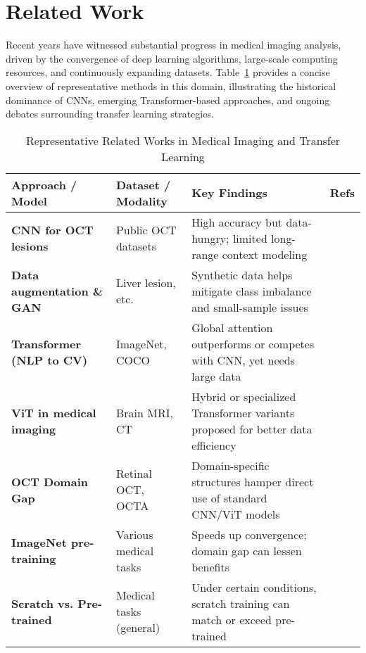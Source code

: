 \section{Related Work}
\label{sec:related}
	
	Recent years have witnessed substantial progress in medical imaging analysis, driven by the convergence of deep learning algorithms, large-scale computing resources, and continuously expanding datasets. Table~\ref{tab:relatedsummary} provides a concise overview of representative methods in this domain, illustrating the historical dominance of CNNs, emerging Transformer-based approaches, and ongoing debates surrounding transfer learning strategies.
	
	\begin{table}[ht]
		\centering
		\caption{Representative Related Works in Medical Imaging and Transfer Learning}
		\label{tab:relatedsummary}
		\begin{tabular}{p{3.2cm}p{3.6cm}p{5cm}p{1.2cm}}
			\toprule
			\textbf{Approach / Model} 
			& \textbf{Dataset / Modality} 
			& \textbf{Key Findings} 
			& \textbf{Refs} \\
			\midrule
			\textbf{CNN for OCT lesions}  
			& Public OCT datasets  
			& High accuracy but data-hungry; limited long-range context modeling  
			& \cite{30Esteva2017,16Kermany2018} \\
			
			\textbf{Data augmentation \& GAN}  
			& Liver lesion, etc.  
			& Synthetic data helps mitigate class imbalance and small-sample issues  
			& \cite{31Frid-Adar2018} \\
			
			\textbf{Transformer (NLP to CV)}
			& ImageNet, COCO  
			& Global attention outperforms or competes with CNN, yet needs large data  
			& \cite{12Wang2018,10Dosovitskiy2020} \\
			
			\textbf{ViT in medical imaging}  
			& Brain MRI, CT  
			& Hybrid or specialized Transformer variants proposed for better data efficiency  
			& \cite{32Touvron2021,33Zhou2022,40Azizi2021} \\
			
			\textbf{OCT Domain Gap}  
			& Retinal OCT, OCTA  
			& Domain-specific structures hamper direct use of standard CNN/ViT models  
			& \cite{35Nassif2004,38Abramoff2010,37Ran2021,41Ran2021} \\
			
			\textbf{ImageNet pre-training}  
			& Various medical tasks  
			& Speeds up convergence; domain gap can lessen benefits  
			& \cite{34Deng2009,28He2019} \\
			
			\textbf{Scratch vs. Pre-trained}  
			& Medical tasks (general)  
			& Under certain conditions, scratch training can match or exceed pre-trained  
			& \cite{28He2019,27Raghu2019} \\
			\bottomrule
		\end{tabular}
	\end{table}
	
